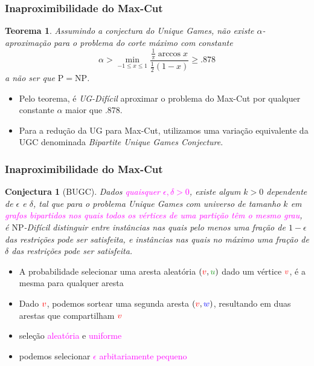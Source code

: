 \documentclass[11pt, handout]{beamer}
\newcommand{\red}[1]{\textcolor{red}{#1}}
\newcommand{\blue}[1]{\textcolor{blue}{#1}}
\newcommand{\green}[1]{\textcolor{pine}{#1}}
\newcommand{\mage}[1]{\textcolor{magenta}{#1}}
\newcommand{\pp}{\ensuremath{\mathrm{P}}\xspace}
\newcommand{\np}{\ensuremath{\mathrm{NP}}\xspace}
\newtheorem{conjectura}{Conjectura}
\newtheorem{teorema}{Teorema}
\begin{document}
\begin{frame}[<+->]
    \frametitle{Inaproximibilidade do Max-Cut}
        \begin{teorema}
            Assumindo a conjectura do Unique Games, não existe $\alpha$-aproximação para o problema do corte máximo com constante
            \[\alpha > \min_{-1 \le x \le 1} \frac{\frac{1}{\pi} \arccos{x}}{\frac{1}{2}(1-x)} \ge .878 \]
            a não ser que $\pp = \np$.
        \end{teorema}
        \begin{itemize}
            \item Pelo teorema, é \emph{UG-Difícil} aproximar o problema do Max-Cut por qualquer constante $\alpha$ maior que $.878$.
            \item Para a redução da UG para Max-Cut, utilizamos uma variação equivalente da UGC denominada \textit{Bipartite Unique Games Conjecture}.
        \end{itemize}
\end{frame}{}


\begin{frame}[<+->]
    \frametitle{Inaproximibilidade do Max-Cut}
        \begin{conjectura}[BUGC]
        Dados \mage{quaisquer $\epsilon,\delta>0$}, existe algum $k>0$ dependente de $\epsilon$ e $\delta$, tal que para o problema Unique Games com universo de tamanho $k$ em \mage{grafos bipartidos nos quais todos os vértices de uma partição têm o mesmo grau}, é \np-Difícil distinguir entre instâncias nas quais pelo menos uma fração de $1-\epsilon$ das restrições pode ser satisfeita, e instâncias nas quais no máximo uma fração de $\delta$ das restrições pode ser satisfeita.
        \end{conjectura}
        \begin{itemize}
            \item A probabilidade selecionar uma aresta aleatória $(\red{v},\green{u})$ dado um vértice $\red{v}$, é a mesma para qualquer aresta
            \item Dado $\red{v}$, podemos sortear uma segunda aresta $(\red{v},\blue{w})$, resultando em duas arestas que compartilham $\red{v}$
            \item seleção \mage{aleatória} e \mage{uniforme}
            \item podemos selecionar \mage{$\epsilon$ arbitariamente pequeno}
        \end{itemize}
\end{frame}{}
\end{document}
